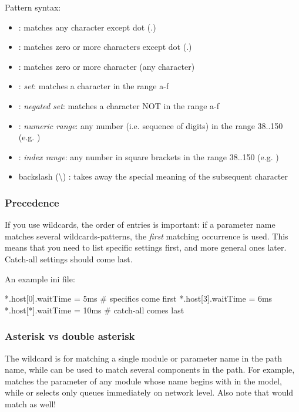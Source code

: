 Pattern syntax:

\begin{itemize}
  \item {} : matches any character except dot (.)
  \item \ttt{*} : matches zero or more characters except dot (.)
  \item \ttt{**} : matches zero or more character (any character)
  \item {} : \textit{set}: matches a character in the range a-f
  \item {}: \textit{negated set}: matches a character
    NOT in the range a-f
  \item {} : \textit{numeric range}: any number (i.e. sequence of digits)
    in the range 38..150  (e.g. )
  \item \ttt{[38..150]} : \textit{index range}: any number in square brackets in the
    range 38..150 (e.g. \ttt{[99]})
  \item backslash ({\textbackslash}) : takes away the special meaning of the
    subsequent character
\end{itemize}

\subsubsection{Precedence}

If you use wildcards, the order of entries is important: if a parameter
name matches several wildcards-patterns, the \textit{first} matching occurrence
is used. This means that you need to list specific settings first, and
more general ones later. Catch-all settings should come last.

An example ini file:

\begin{inifile}
[General]
*.host[0].waitTime = 5ms   # specifics come first
*.host[3].waitTime = 6ms
*.host[*].waitTime = 10ms  # catch-all comes last
\end{inifile}


\subsubsection{Asterisk vs double asterisk}

The \ttt{*} wildcard is for matching a single module or parameter name in the
path name, while \ttt{**} can be used to match several components in the path.
For example,  matches the  parameter of any module
whose name begins with  in the model, while 
or  selects only queues immediately on network level.
Also note that  would match 
as well!

